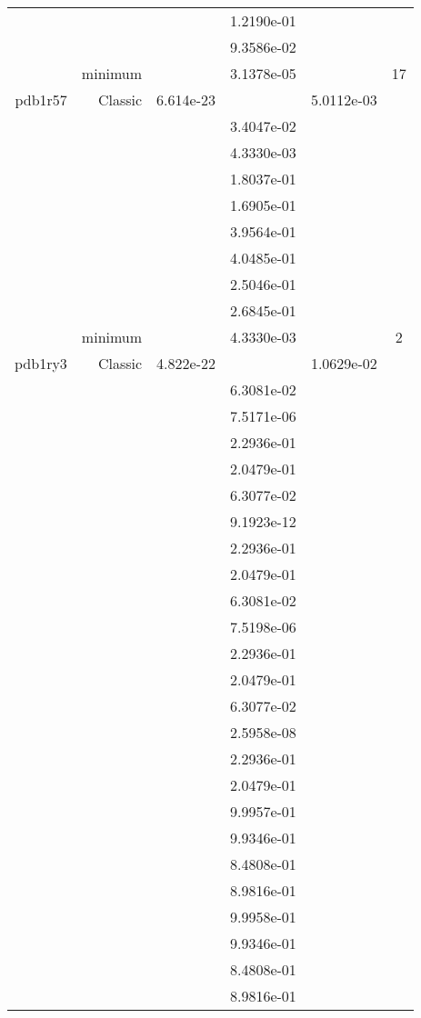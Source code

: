 \begin{xltabular}{\textwidth}{r|rS[table-format=1.3e+2]S[table-format=1.4e+2]S[table-format=1.4e+2]S[table-format=-1.5]}
&  &  & 1.2190e-01 & & \\
&  &  & 9.3586e-02 & & \\
& minimum &  & 3.1378e-05 & & 17 \\  \addlinespace
pdb1r57 & Classic & 6.614e-23 &  & 5.0112e-03 & \\
&  &  & 3.4047e-02 & & \\
&  &  & 4.3330e-03 & & \\
&  &  & 1.8037e-01 & & \\
&  &  & 1.6905e-01 & & \\
&  &  & 3.9564e-01 & & \\
&  &  & 4.0485e-01 & & \\
&  &  & 2.5046e-01 & & \\
&  &  & 2.6845e-01 & & \\
& minimum &  & 4.3330e-03 & & 2 \\  \addlinespace
pdb1ry3 & Classic & 4.822e-22 &  & 1.0629e-02 & \\
&  &  & 6.3081e-02 & & \\
&  &  & 7.5171e-06 & & \\
&  &  & 2.2936e-01 & & \\
&  &  & 2.0479e-01 & & \\
&  &  & 6.3077e-02 & & \\
&  &  & 9.1923e-12 & & \\
&  &  & 2.2936e-01 & & \\
&  &  & 2.0479e-01 & & \\
&  &  & 6.3081e-02 & & \\
&  &  & 7.5198e-06 & & \\
&  &  & 2.2936e-01 & & \\
&  &  & 2.0479e-01 & & \\
&  &  & 6.3077e-02 & & \\
&  &  & 2.5958e-08 & & \\
&  &  & 2.2936e-01 & & \\
&  &  & 2.0479e-01 & & \\
&  &  & 9.9957e-01 & & \\
&  &  & 9.9346e-01 & & \\
&  &  & 8.4808e-01 & & \\
&  &  & 8.9816e-01 & & \\
&  &  & 9.9958e-01 & & \\
&  &  & 9.9346e-01 & & \\
&  &  & 8.4808e-01 & & \\
&  &  & 8.9816e-01 & & \\

\end{xltabular}
